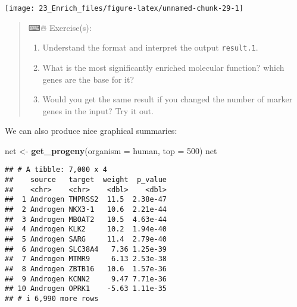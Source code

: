\documentclass[
]{article}
\newenvironment{Shaded}{\begin{snugshade}}{\end{snugshade}}
\newcommand{\AttributeTok}[1]{\textcolor[rgb]{0.13,0.29,0.53}{#1}}
\newcommand{\DecValTok}[1]{\textcolor[rgb]{0.00,0.00,0.81}{#1}}
\newcommand{\FunctionTok}[1]{\textcolor[rgb]{0.13,0.29,0.53}{\textbf{#1}}}
\newcommand{\NormalTok}[1]{#1}
\newcommand{\OtherTok}[1]{\textcolor[rgb]{0.56,0.35,0.01}{#1}}
\newcommand{\SpecialCharTok}[1]{\textcolor[rgb]{0.81,0.36,0.00}{\textbf{#1}}}
\newcommand{\StringTok}[1]{\textcolor[rgb]{0.31,0.60,0.02}{#1}}
\providecommand{\tightlist}{%
  \setlength{\itemsep}{0pt}\setlength{\parskip}{0pt}}
\begin{document}
\texttt{[image: 23\_Enrich\_files/figure-latex/unnamed-chunk-29-1]}

\begin{quote}
⌨🔥 Exercise(s):

\begin{enumerate}
\def\labelenumi{\arabic{enumi}.}
\tightlist
\item
  Understand the format and interpret the output \texttt{result.1}.
\item
  What is the most significantly enriched molecular function? which
  genes are the base for it?
\item
  Would you get the same result if you changed the number of marker
  genes in the input? Try it out.
\end{enumerate}
\end{quote}

We can also produce nice graphical summaries:

\begin{Shaded}
\begin{Highlighting}[]
\NormalTok{net }\OtherTok{\textless{}{-}} \FunctionTok{get\_progeny}\NormalTok{(}\AttributeTok{organism =} \StringTok{\textquotesingle{}human\textquotesingle{}}\NormalTok{, }\AttributeTok{top =} \DecValTok{500}\NormalTok{)}
\NormalTok{net}
\end{Highlighting}
\end{Shaded}

\begin{verbatim}
## # A tibble: 7,000 x 4
##    source   target  weight  p_value
##    <chr>    <chr>    <dbl>    <dbl>
##  1 Androgen TMPRSS2  11.5  2.38e-47
##  2 Androgen NKX3-1   10.6  2.21e-44
##  3 Androgen MBOAT2   10.5  4.63e-44
##  4 Androgen KLK2     10.2  1.94e-40
##  5 Androgen SARG     11.4  2.79e-40
##  6 Androgen SLC38A4   7.36 1.25e-39
##  7 Androgen MTMR9     6.13 2.53e-38
##  8 Androgen ZBTB16   10.6  1.57e-36
##  9 Androgen KCNN2     9.47 7.71e-36
## 10 Androgen OPRK1    -5.63 1.11e-35
## # i 6,990 more rows
\end{verbatim}

\begin{Shaded}
\end{Shaded}
\end{document}
